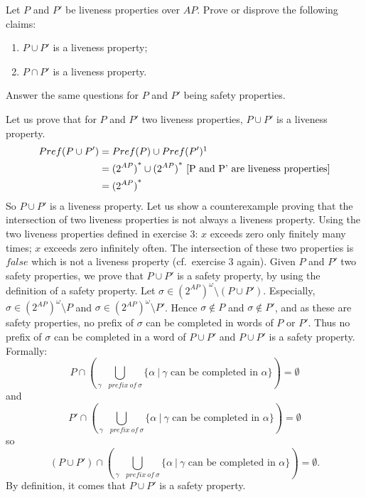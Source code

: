 \documentclass[11pt,a4paper]{article}
\newcommand\twoap{2^{AP}}
\begin{document}
\begin{Exercise}
Let $P$ and $P'$ be liveness properties over $AP$. Prove or disprove the following claims:
\begin{enumerate}
\item $P \cup P'$ is a liveness property;
\item $P \cap P'$ is a liveness property.
\end{enumerate}
Answer the same questions for $P$ and $P'$ being safety properties.
\end{Exercise}

\begin{Answer}
\Question%
Let us prove that for $P$ and $P'$ two liveness properties, $P \cup P'$ is a liveness property.
\begin{align*}Pref(P \cup P') &= Pref(P) \cup Pref(P')\footnotemark[1]\\
                              &= {(2^{AP})}^* \cup {(2^{AP})}^* \text{ [P and P' are liveness properties]}\\
                              &= {(2^{AP})}^*
\end{align*}
So $P \cup P'$ is a liveness property.
\Question%
Let us show a counterexample proving that the intersection of two liveness properties is not always a liveness property.
Using the two liveness properties defined in exercise 3: $x$ exceeds zero only finitely many times; $x$ exceeds zero infinitely often.
The intersection of these two properties is $false$ which is not a liveness property (cf.\ exercise 3 again).
\Question%
Given $P$ and $P'$ two safety properties, we prove that $P\cup P'$ is a safety property, by using the definition of a safety property. Let $\sigma \in (\twoap)^\omega \setminus (P\cup P')$. Especially, $\sigma \in (\twoap)^\omega \setminus P$ and $\sigma \in (\twoap)^\omega \setminus P'$. Hence $\sigma \notin P$ and $\sigma \notin P'$, and as these are safety properties, no prefix of $\sigma$ can be completed in words of $P$ or $P'$. Thus no prefix of $\sigma$ can be completed in a word of $P \cup P'$ and $P \cup P'$ is a safety property. 
Formally: $$P\cap(\bigcup_{\gamma\quad prefix~of~\sigma} \{\alpha ~|~ \gamma \text{ can be completed in }\alpha \})=\emptyset$$ and $$P'\cap(\bigcup_{\gamma\quad prefix~of~\sigma} \{\alpha ~|~ \gamma \text{ can be completed in }\alpha \})=\emptyset$$ so $$(P\cup P')\cap(\bigcup_{\gamma\quad prefix~of~\sigma} \{\alpha ~|~ \gamma \text{ can be completed in }\alpha \})=\emptyset.$$ By definition, it comes that $P\cup P'$ is a safety property.


\end{Answer}
\end{document}
